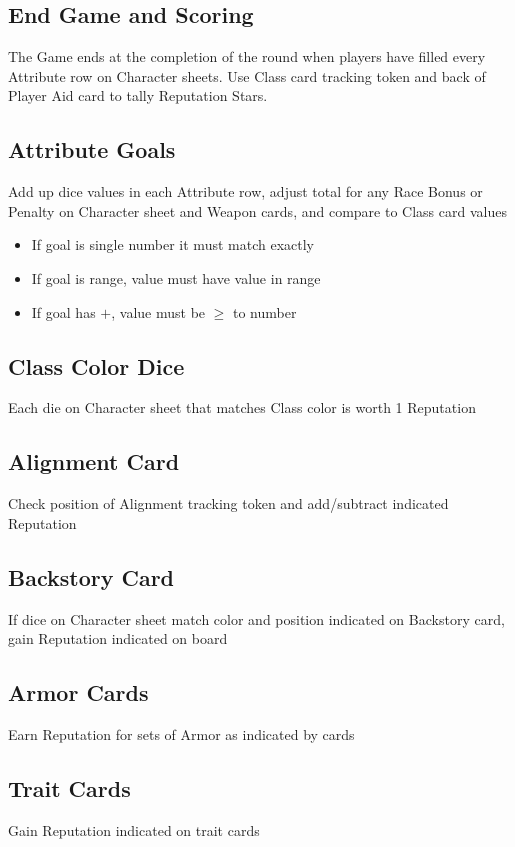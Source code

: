 \documentclass[12pt]{article}
\newenvironment{itemizeCustom}
{\begin{itemize}
  \setlength{\itemsep}{1pt}
  \setlength{\parskip}{0pt}
  \setlength{\parsep}{0pt}}
{\end{itemize}}
\begin{document}
\begin{multicols*}{2}
\section*{End Game and Scoring}
The Game ends at the completion of the round when players have filled every Attribute row on Character sheets. Use Class card tracking token and back of Player Aid card to tally Reputation Stars.

\subsection*{Attribute Goals}
Add up dice values in each Attribute row, adjust total for any Race Bonus or Penalty on Character sheet and Weapon cards, and compare to Class card values
\begin{itemizeCustom}
    \item If goal is single number it must match exactly
    \item If goal is range, value must have value in range
    \item If goal has $+$, value must be $\geq$ to number
\end{itemizeCustom}

\subsection*{Class Color Dice}
Each die on Character sheet that matches Class color is worth 1 Reputation

\subsection*{Alignment Card}
Check position of Alignment tracking token and add/subtract indicated Reputation

\subsection*{Backstory Card}
If dice on Character sheet match color and position indicated on Backstory card, gain Reputation indicated on board

\subsection*{Armor Cards}
Earn Reputation for sets of Armor as indicated by cards

\subsection*{Trait Cards}
Gain Reputation indicated on trait cards

\end{multicols*}
\end{document}
